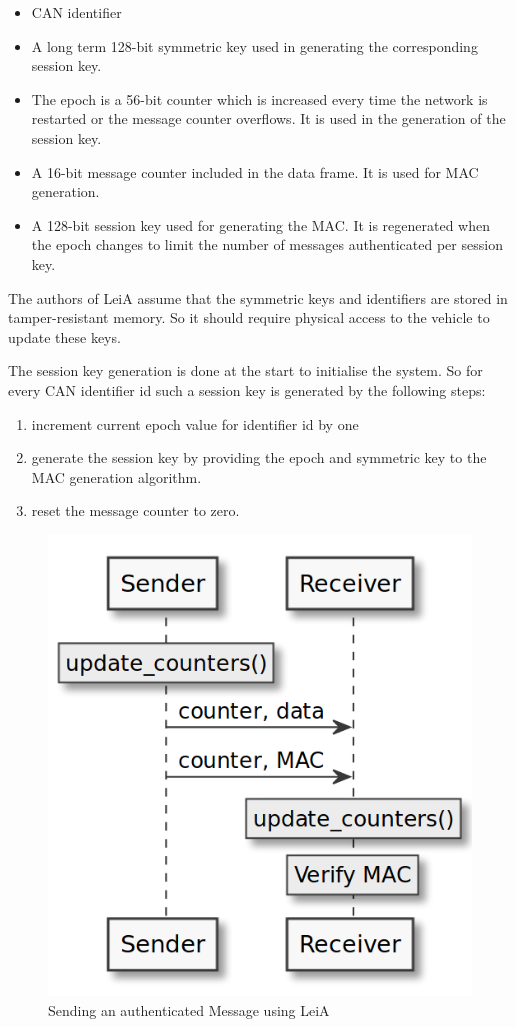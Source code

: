 \begin{itemize}
    \item CAN identifier
    \item A long term 128-bit symmetric key used in generating the corresponding session key.
    \item The epoch is a 56-bit counter which is increased every time the network is restarted or the message counter overflows. It is used in the generation of the session key.
    \item A 16-bit message counter included in the data frame. It is used for MAC generation.
    \item A 128-bit session key used for generating the MAC. It is regenerated when the epoch changes to limit the number of messages authenticated per session key.
\end{itemize}

The authors of LeiA assume that the symmetric keys and identifiers are stored in tamper-resistant memory. So it should require physical access to the vehicle to update these keys.

The session key generation is done at the start to initialise the system. So for every CAN identifier id such a session key is generated by the following steps:

\begin{enumerate}
    \item increment current epoch value for identifier id by one
    \item generate the session key by providing the epoch and symmetric key to the MAC generation algorithm.
    \item reset the message counter to zero.
\end{enumerate}

\begin{figure}[h]
    \centering
    \captionsetup{justification=centering}
	\includegraphics[width=0.6\linewidth]{Figures/LeiA_sending_msg.png}
	\caption[]{Sending an authenticated Message using LeiA}
	\label{fig:leia_sending_msg}
\end{figure}

